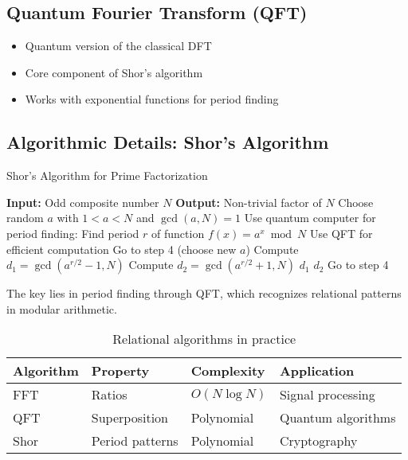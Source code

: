 \documentclass[11pt,a4paper]{article}
\begin{document}
	\subsection{Quantum Fourier Transform (QFT)}
	
	\begin{itemize}
		\item Quantum version of the classical DFT
		\item Core component of Shor's algorithm
		\item Works with exponential functions for period finding
	\end{itemize}
	
	\subsection{Algorithmic Details: Shor's Algorithm}
	
	\begin{algorithm}[htbp]
		\caption{Shor's Algorithm for Prime Factorization}
		\label{alg:shor}
		\begin{algorithmic}[1]
			\STATE \textbf{Input:} Odd composite number $N$
			\STATE \textbf{Output:} Non-trivial factor of $N$
			\STATE 
			\STATE Choose random $a$ with $1 < a < N$ and $\gcd(a,N) = 1$
			\STATE Use quantum computer for period finding:
			\STATE \quad Find period $r$ of function $f(x) = a^x \bmod N$
			\STATE \quad Use QFT for efficient computation
			\STATE Go to step 4 (choose new $a$)
			\ENDIF
			\STATE Compute $d_1 = \gcd(a^{r/2} - 1, N)$
			\STATE Compute $d_2 = \gcd(a^{r/2} + 1, N)$
			\RETURN $d_1$
			\RETURN $d_2$
			\ELSE
			\STATE Go to step 4
			\ENDIF
		\end{algorithmic}
	\end{algorithm}
	
	The key lies in period finding through QFT, which recognizes relational patterns in modular arithmetic.
	
	\begin{table}[htbp]
		\centering
		\begin{adjustbox}{width=0.85\textwidth}
			\begin{tabular}{llll}
				\toprule
				\textbf{Algorithm} & \textbf{Property} & \textbf{Complexity} & \textbf{Application} \\
				\midrule
				FFT & Ratios & $O(N \log N)$ & Signal processing \\
				QFT & Superposition & Polynomial & Quantum algorithms \\
				Shor & Period patterns & Polynomial & Cryptography \\
				\bottomrule
			\end{tabular}
		\end{adjustbox}
		\caption{Relational algorithms in practice}
		\label{tab:algorithmen}
	\end{table}
	
\end{document}
